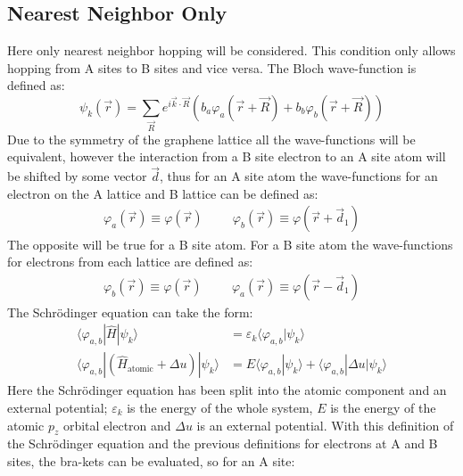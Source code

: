 	\subsection{Nearest Neighbor Only}
		\label{nearest-neighbor-only}
		Here only nearest neighbor hopping will be considered. This condition only allows hopping from A sites to B sites and vice versa. The Bloch wave-function \cite{b44} is defined as:
		\begin{equation}							 \psi_{k}\left(\vec{r}\right)=\sum\limits_{\vec{R}}e^{i\vec{k}\cdot\vec{R}}\left(b_{a}\varphi_{a}\left(\vec{r}+\vec{R}\right)+b_{b}\varphi_{b}\left(\vec{r}+\vec{R}\right)\right)
		\end{equation}
		Due to the symmetry of the graphene lattice all the wave-functions will be equivalent, however the interaction from a B site electron to an A site atom will be shifted by some vector $\vec{d}$, thus for an A site atom the wave-functions for an electron on the A lattice and B lattice can be defined as:
		\begin{align}
 			\varphi_{a}\left(\vec{r}\right)\equiv\varphi\left(\vec{r}\right)\hspace{1cm}\varphi_{b}\left(\vec{r}\right)\equiv\varphi\left(\vec{r}+\vec{d}_{1}\right)
		\end{align}
		The opposite will be true for a B site atom. For a B site atom the wave-functions for electrons from each lattice are defined as:
		\begin{align}
 			\varphi_{b}\left(\vec{r}\right)\equiv\varphi\left(\vec{r}\right)\hspace{1cm}\varphi_{a}\left(\vec{r}\right)\equiv\varphi\left(\vec{r}-\vec{d}_{1}\right)
		\end{align}
			The Schr{\" o}dinger equation can take the form:
			\begin{align}
				\langle\varphi_{a,b}|\hat{H}|\psi_{k}\rangle&=\varepsilon_{k}\langle\varphi_{a,b}|\psi_{k}\rangle\\
				\langle\varphi_{a,b}|(\hat{H}_{\mathrm{atomic}}+\Delta u)|\psi_{k}\rangle&=E\langle\varphi_{a,b}|\psi_{k}\rangle+\langle\varphi_{a,b}|\Delta u|\psi_{k}\rangle
			\end{align}
			Here the Schr{\" o}dinger equation has been split into the atomic component and an external potential; $\varepsilon_{k}$ is the energy of the whole system, $E$ is the energy of the atomic $p_{z}$ orbital electron and $\Delta u$ is an external potential. With this definition of the Schr{\" o}dinger equation and the previous definitions for electrons at A and B sites, the bra-kets can be evaluated, so for an A site:
